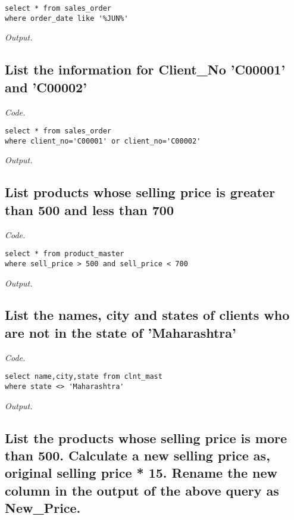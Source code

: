 \documentclass[12pt]{article}
\begin{document}
\begin{lstlisting}
select * from sales_order
where order_date like '%JUN%'
\end{lstlisting}

\textit{Output.}\\

\subsection{List the information for Client\_No 'C00001' and 'C00002'}

\textit{Code.}

\begin{lstlisting}
select * from sales_order
where client_no='C00001' or client_no='C00002'
\end{lstlisting}

\textit{Output.}\\

\subsection{List products whose selling price is greater than 500 and less than 700}

\textit{Code.}

\begin{lstlisting}
select * from product_master
where sell_price > 500 and sell_price < 700
\end{lstlisting}

\textit{Output.}\\

\subsection{List the names, city and states of clients who are not in the state of 'Maharashtra'}

\textit{Code.}

\begin{lstlisting}
select name,city,state from clnt_mast
where state <> 'Maharashtra'
\end{lstlisting}

\textit{Output.}\\

\subsection{List the products whose selling price is more than 500. Calculate a new selling price as, original selling price * 15. Rename the new column in the output of the above query as New\_Price.}
\end{document}
